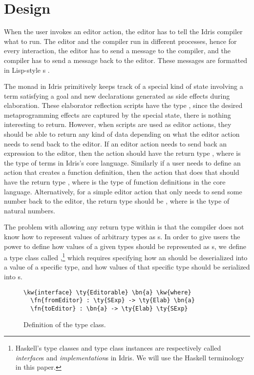 \section{Design}\label{sec:design}

When the user invokes an editor action, the editor has to tell the Idris
compiler what to run. The editor and the compiler run in different processes,
hence for every interaction, the editor has to send a message to the compiler,
and the compiler has to send a message back to the editor.
These messages are formatted in Lisp-style \sexp{}s \cite{mccarthy}.

The \Elab{} monad in Idris primitively keeps track of a special kind of state
involving a term satisfying a goal and new declarations generated as
side effects during elaboration.
These elaborator reflection scripts have the type \mbox{}, since the
desired metaprogramming effects are captured by the special state, there is
nothing interesting to return.
However, when \Elab{} scripts are used as editor actions, they should be able
to return any kind of data depending on what the editor action needs to send
back to the editor.
If an editor action needs to send back an expression to the editor, then the
action should have the return type \mbox{}, where  is the type of
terms in Idris's core language.
Similarly if a user needs to define an action that creates a function definition,
then the action that does that should have the return type \mbox{},
where  is the type of function definitions in the core language.
Alternatively, for a simple editor action that only needs to send some number back
to the editor, the return type should be \mbox{}, where  is the
type of natural numbers.

The problem with allowing any return type within \Elab{} is that the compiler
does not know how to represent values of arbitrary types as \sexp{}s.
In order to give users the power to define how values of a given types should
be represented as \sexp{}s, we define a type class called
\Editorable{},\footnote{Haskell's type classes and type class instances are
respectively called \emph{interface}s and \emph{implementation}s in Idris. We
will use the Haskell terminology in this paper.}
which requires specifying how an \sexp{} should be deserialized into a
value of a specific type, and how values of that specific type should be
serialized into \sexp{}s.

\begin{figure}[H]
\begin{Verbatim}
\kw{interface} \ty{Editorable} \bn{a} \kw{where}
  \fn{fromEditor} : \ty{SExp} -> \ty{Elab} \bn{a}
  \fn{toEditor} : \bn{a} -> \ty{Elab} \ty{SExp}
\end{Verbatim}
\caption{Definition of the \Editorable{} type class.}
\label{code:editorable}
\end{figure}

